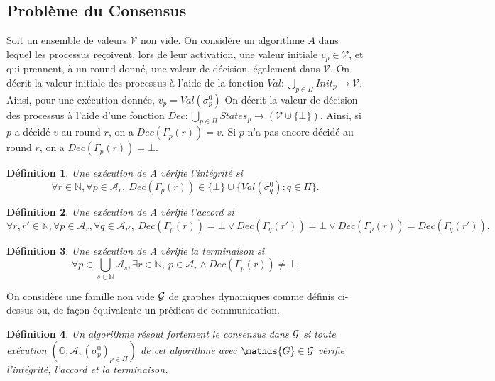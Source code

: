 \documentclass{article}
\newtheorem{definition}{Définition}
\begin{document}
\subsection{Probl\`eme du Consensus}

	Soit un ensemble de valeurs $\mathcal{V}$ non vide.
	On considère un algorithme $A$ dans lequel les processus reçoivent, lors de leur activation, une valeur initiale $v_p \in \mathcal{V}$,
	et qui prennent, à un round donné, une valeur de décision, également dans $\mathcal{V}$.
	On décrit la valeur initiale des processus à l'aide de la fonction $Val : \bigcup\limits_{p \in \Pi} Init_p  \rightarrow \mathcal{V}$.
	Ainsi, pour une exécution donnée, $v_p = Val(\sigma_p^0)$
	On décrit la valeur de décision des processus à l'aide d'une fonction
	$Dec : \bigcup\limits_{p \in \Pi} States_p  \rightarrow (\mathcal{V} \uplus \{\bot\})$.
	Ainsi, si $p$ a décidé $v$ au round $r$, on a $Dec(\Gamma_p(r)) = v$. Si $p$ n'a pas encore décidé au round $r$, on a $Dec(\Gamma_p(r)) = \bot$.

\begin{definition}
	Une exécution de A \emph{vérifie  l'intégrité} si 
	$$ \forall r \in \mathds{N},\forall p \in \mathcal{A}_{r}, \ Dec(\Gamma_p(r)) \in \{ \bot \} \cup  \{ Val(\sigma^0_q) :  q \in \Pi \}  .$$
\end{definition}

\begin{definition}
	Une exécution de A  \emph{vérifie l'accord} si
	$$\forall r, r'  \in \mathds{N}, \forall p \in \mathcal{A}_{r}, \forall q \in \mathcal{A}_{r'}, 
		\ Dec(\Gamma_p(r)) = \bot \vee Dec(\Gamma_q(r')) = \bot \vee Dec(\Gamma_p(r)) = Dec(\Gamma_q(r')) .$$
\end{definition}

\begin{definition}
	Une exécution de A \emph{vérifie la terminaison} si
	$$ \forall p \in \bigcup\limits_{s \in \mathds{N}} \mathcal{A}_s, \exists r \in \mathds{N}, \ 
		p \in \mathcal{A}_r \wedge Dec(\Gamma_p(r)) \neq \bot .  $$
\end{definition}

On consid\`ere une famille non vide ${\cal G}$ de graphes dynamiques comme d\'efinis ci-dessus
	ou, de fa\c{c}on \'equivalente un pr\'edicat de communication. %
	
\begin{definition}
	Un algorithme \emph{résout fortement le consensus dans ${\cal G}$} si toute exécution 
	$( \mathds{G} ,  \mathcal{A} , (\sigma^0_p)_{p \in \Pi})$    de cet algorithme
	avec $ \mathds{G} \in {\cal G}$  vérifie l'intégrité, l'accord et la terminaison.
\end{definition}
\end{document}
